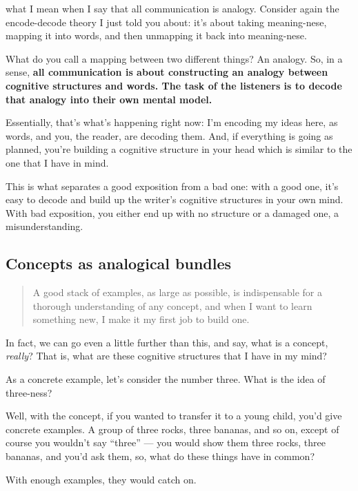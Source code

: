  what I mean when I say that all communication is analogy.
Consider again the encode-decode theory I just told you about: it's
about taking meaning-nese, mapping it into words, and then unmapping it
back into meaning-nese.

What do you call a mapping between two different things? An analogy. So,
in a sense, \textbf{all communication is about constructing an analogy
between cognitive structures and words. The task of the
listeners is to decode that analogy into their own mental model.}

Essentially, that's what's happening right now: I'm encoding my ideas
here, as words, and you, the reader, are decoding them. And, if
everything is going as planned, you're building a cognitive structure in
your head which is similar to the one that I have in mind.

This is what separates a good exposition from a bad one: with a good
one, it's easy to decode and build up the writer's cognitive structures
in your own mind. With bad exposition, you either end up with no
structure or a damaged one, a misunderstanding.

\subsection{Concepts as analogical
  bundles}\label{concepts-as-analogical-bundles}

\begin{quote}
A good stack of examples, as large as possible, is indispensable for a thorough
understanding of any concept, and when I want to learn something new, I make it
my first job to build one.
\end{quote}

In fact, we can go even a little further than this, and say, what is a
concept, \emph{really}? That is, what are these cognitive structures
that I have in my mind?

As a concrete example, let's consider the number three. What is the idea
of three-ness?

Well, with the concept, if you wanted to transfer it to a young child,
you'd give concrete examples. A group of three rocks, three bananas, and
so on, except of course you wouldn't say ``three'' --- you would show
them three rocks, three bananas, and you'd ask them, so, what do these
things have in common?

With enough examples, they would catch on.

